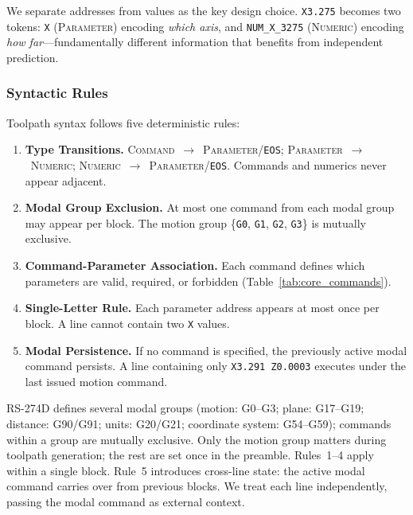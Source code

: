 \documentclass[11pt]{article}
\begin{document}
We separate addresses from values as the key design choice. \texttt{X3.275} becomes two tokens: \texttt{X} (\textsc{Parameter}) encoding \emph{which axis}, and \texttt{NUM\_X\_3275} (\textsc{Numeric}) encoding \emph{how far}---fundamentally different information that benefits from independent prediction.

\subsubsection{Syntactic Rules}

Toolpath syntax follows five deterministic rules:

\begin{enumerate}[leftmargin=*]
    \item \textbf{Type Transitions.} \textsc{Command}~$\to$~\textsc{Parameter}/\texttt{EOS}; \textsc{Parameter}~$\to$~\textsc{Numeric}; \textsc{Numeric}~$\to$~\textsc{Parameter}/\texttt{EOS}. Commands and numerics never appear adjacent.

    \item \textbf{Modal Group Exclusion.} At most one command from each modal group may appear per block. The motion group \{\texttt{G0}, \texttt{G1}, \texttt{G2}, \texttt{G3}\} is mutually exclusive.

    \item \textbf{Command-Parameter Association.} Each command defines which parameters are valid, required, or forbidden (Table~\ref{tab:core_commands}).

    \item \textbf{Single-Letter Rule.} Each parameter address appears at most once per block. A line cannot contain two \texttt{X} values.

    \item \textbf{Modal Persistence.} If no command is specified, the previously active modal command persists. A line containing only \texttt{X3.291 Z0.0003} executes under the last issued motion command.
\end{enumerate}

RS-274D defines several modal groups (motion: G0--G3; plane: G17--G19; distance: G90/G91; units: G20/G21; coordinate system: G54--G59); commands within a group are mutually exclusive. Only the motion group matters during toolpath generation; the rest are set once in the preamble. Rules~1--4 apply within a single block. Rule~5 introduces cross-line state: the active modal command carries over from previous blocks. We treat each line independently, passing the modal command as external context.
\end{document}
